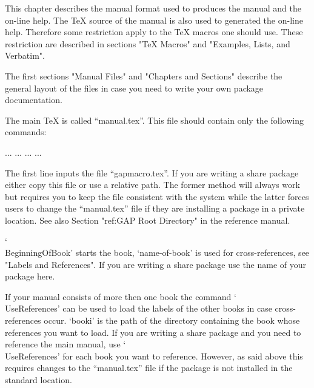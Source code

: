 

This chapter  describes  the manual format used  to   produces the {\GAP}
manual and the on-line  help.  The {\TeX}   source of the manual is  also
used to generated the on-line help.  Therefore  some restriction apply to
the {\TeX} macros one   should use.  These  restriction are  described in
sections "TeX Macros" and "Examples, Lists, and Verbatim".

The first sections "Manual  Files"  and "Chapters and Sections"  describe
the  general  layout of the  files  in case  you need to   write your own
package documentation.


The main {\TeX} is called  ``manual.tex''.  This file should contain only
the following commands:

\begintt
  
    ...
    \TableOfContents
    \FrontMatter
      ...
    \Chapters
      ...
    \Appendices
      ...
      \Answers
      \Bibliography
      \Index
  \EndOfBook
\endtt

The first  line inputs the  file ``gapmacro.tex''.  If  you are writing a
share package  either copy this file or use a  relative path.  The former
method will always work but requires you to keep the file consistent with
the  system while  the latter  forces users to  change the ``manual.tex''
file  if they are installing  a package in  a private location.  See also
Section "ref:GAP Root Directory" in the reference manual.

`\\BeginningOfBook' starts   the   book, `name-of-book'   is  used    for
cross-references,  see "Labels  and References".   If  you are  writing a
share package use the name of your package here.

If   your manual   consists   of more    then    one book  the    command
`\\UseReferences' can  be used to  load the labels  of the other books in
case  cross-references  occur.  `booki'  is  the  path  of the  directory
containing  the book  whose  references you want  to   load.  If you  are
writing a share package and you need to reference the main {\GAP} manual,
use  `\\UseReferences' for each book  you want to reference.  However, as
said  above  this requires  changes to   the ``manual.tex'' file   if the
package is not installed in the standard location.

